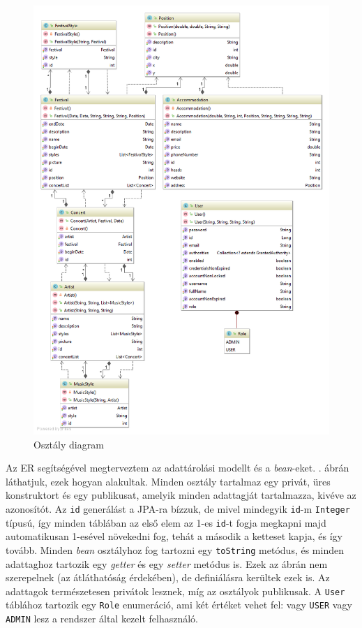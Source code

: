 
\begin{figure}
\centering
\includegraphics[scale=0.56]{kepek/uml.png}
\caption{Osztály diagram}
\label{fig:umlclass}
\end{figure}

Az ER segítségével megterveztem az adattárolási modellt és a \textit{bean}-eket. . ábrán láthatjuk, ezek hogyan alakultak. Minden osztály tartalmaz egy privát, üres konstruktort és egy publikusat, amelyik minden adattagját tartalmazza, kivéve az azonosítót. Az \texttt{id} generálást a JPA-ra bízzuk, de mivel mindegyik \texttt{id}-m \texttt{Integer} típusú, így minden táblában az első elem az 1-es \texttt{id}-t fogja megkapni majd automatikusan 1-esével növekedni fog, tehát a második a ketteset kapja, és így tovább. Minden \textit{bean} osztályhoz fog tartozni egy \texttt{toString} metódus, és minden adattaghoz tartozik egy \textit{getter} és egy \textit{setter} metódus is. Ezek az ábrán nem szerepelnek (az átláthatóság érdekében), de definiálásra kerültek ezek is. Az adattagok természetesen privátok lesznek, míg az osztályok publikusak. A \texttt{User} táblához tartozik egy \texttt{Role} enumeráció, ami két értéket vehet fel: vagy \texttt{USER} vagy \texttt{ADMIN} lesz a rendszer által kezelt felhasználó.

